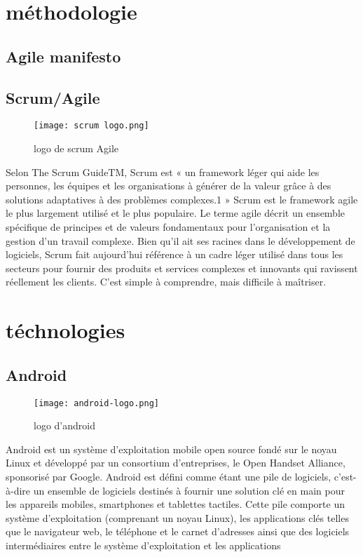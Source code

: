 \section{méthodologie}
\subsection{Agile manifesto}

\subsection{Scrum/Agile}
\begin{wrapfigure}{r}{0.25\textwidth} 
    \centering
    \texttt{[image: scrum logo.png]}
    \caption{logo de scrum Agile}
\end{wrapfigure}
Selon The Scrum GuideTM, Scrum est « un framework léger qui aide les personnes, les équipes et les organisations à générer de la valeur grâce à des solutions adaptatives à des problèmes complexes.1 » Scrum est le framework agile le plus largement utilisé et le plus populaire. Le terme agile décrit un ensemble spécifique de principes et de valeurs fondamentaux pour l'organisation et la gestion d'un travail complexe.
Bien qu'il ait ses racines dans le développement de logiciels, Scrum fait aujourd'hui référence à un cadre léger utilisé dans tous les secteurs pour fournir des produits et services complexes et innovants qui ravissent réellement les clients. C'est simple à comprendre, mais difficile à maîtriser.
\cite*{scrumalliance}

\section{téchnologies}

\subsection{Android}
\begin{wrapfigure}{r}{0.25\textwidth} 
    \centering
    \texttt{[image: android-logo.png]}
    \caption{logo d'android}
\end{wrapfigure}
Android est un système d'exploitation mobile open source fondé sur le noyau Linux et développé par un consortium d'entreprises, le Open Handset Alliance, sponsorisé par Google. 
Android est défini comme étant une pile de logiciels, c'est-à-dire un ensemble de logiciels destinés à fournir une solution clé en main pour les appareils mobiles, smartphones et tablettes tactiles. Cette pile comporte un système d'exploitation (comprenant un noyau Linux), les applications clés telles que le navigateur web, le téléphone et le carnet d'adresses ainsi que des logiciels intermédiaires entre le système d'exploitation et les applications
\cite*{wiki:Android}

